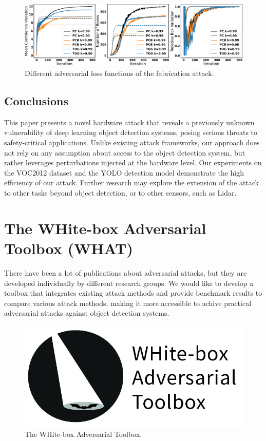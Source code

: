 \begin{figure}[t]
    \centering
    \includegraphics[width=0.9\linewidth]{figures/chapter_detection/loss.png}
    \caption{Different adversarial loss functions of the  fabrication attack.}
    \label{fig:loss}
\end{figure}

\subsection{Conclusions}


This paper presents a novel hardware attack that reveals a previously unknown vulnerability of deep learning object detection systems, posing serious threats to safety-critical applications. Unlike existing attack frameworks, our approach does not rely on any assumption about access to the object detection system, but rather leverages perturbations injected at the hardware level. Our experiments on the VOC2012 dataset and the YOLO detection model demonstrate the high efficiency of our attack. Further research may explore the extension of the attack to other tasks beyond object detection, or to other sensors, such as Lidar.


\section{The WHite-box Adversarial Toolbox (WHAT)}
\label{sec:what}

There have been a lot of publications about adversarial attacks, but they are developed individually by different research groups. We would like to develop a toolbox that integrates existing attack methods and provide benchmark results to compare various attack methods, making it more accessible to achive practical adversarial attacks against object detection systems.

\begin{figure}[H]
    \centering
    \includegraphics[scale=0.4]{figures/chapter_detection/what.png}
    \caption{The WHite-box Adversarial Toolbox.}
    \label{fig:what}
\end{figure}

